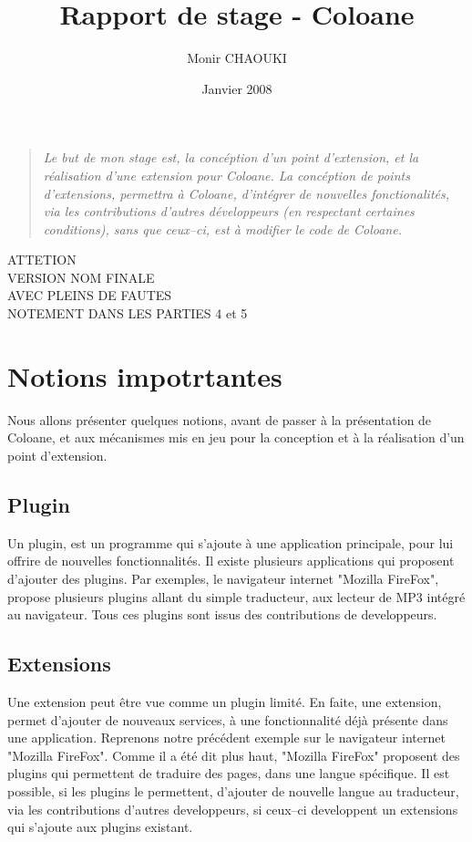 \documentclass{article}
\title{Rapport de stage - Coloane}
\date{Janvier 2008}
\author{Monir CHAOUKI}
\begin{document}
\maketitle

\begin{quotation}
\textit{
Le but de mon stage est, la concéption d'un point d'extension, et la réalisation 
d'une extension pour Coloane. La concéption de points d'extensions, permettra à 
Coloane, d'intégrer de nouvelles fonctionalités, via les contributions 
d'autres développeurs (en respectant certaines conditions), sans que ceux--ci,
 est à modifier le code de Coloane.}
\end{quotation}


{\Huge ATTETION\\ VERSION NOM FINALE\\ AVEC PLEINS DE FAUTES \\NOTEMENT DANS LES PARTIES 4 et 5}


\newpage

\section{Notions impotrtantes}
Nous allons présenter quelques notions, avant de passer à la présentation de 
Coloane, et aux mécanismes mis en jeu pour la conception et à la réalisation 
d'un point d'extension.

\subsection{Plugin}
Un plugin, est un programme qui s'ajoute à une application principale, pour lui 
offrire de nouvelles fonctionnalités. Il existe plusieurs applications qui 
proposent d'ajouter des plugins. Par exemples, le navigateur internet 
"Mozilla FireFox", propose plusieurs plugins allant du simple traducteur, aux 
lecteur de MP3 intégré au navigateur. Tous ces plugins sont issus des 
contributions de developpeurs.

\subsection{Extensions}
Une extension peut être vue comme un plugin limité. En faite, une extension, 
permet d'ajouter de nouveaux services, à une fonctionnalité déjà présente dans 
une application. Reprenons notre précédent exemple sur le navigateur internet 
"Mozilla FireFox". Comme il a été dit plus haut, "Mozilla FireFox" proposent 
des plugins qui permettent de traduire des pages, dans une langue spécifique. 
Il est possible, si les plugins le permettent, d'ajouter de nouvelle langue au 
traducteur, via les contributions d'autres developpeurs, si ceux--ci developpent 
un extensions qui s'ajoute aux plugins existant.
\end{document}
